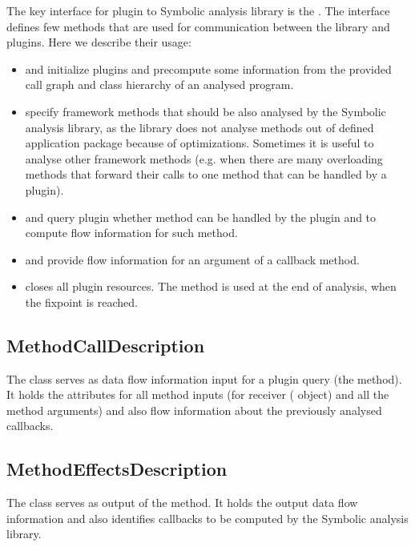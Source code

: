 The key interface for plugin to Symbolic analysis library is the\break
{}.
The interface defines few methods that are used for communication between the library and plugins.
Here we describe their usage:
\begin{itemize}
  \item {} and  initialize plugins
    and precompute some information from the provided call graph and class hierarchy
    of an analysed program.
  \item {} specify framework methods that should
    be also analysed by the Symbolic analysis library, as the library does not
    analyse methods out of defined application package because of optimizations.
    Sometimes it is useful to analyse other framework methods
    (e.g. when there are many overloading methods that forward their calls to one method
    that can be handled by a plugin).
  \item {} and  query plugin whether method can be
    handled by the plugin and to compute flow information for such method.
  \item {} and  provide flow information for
    an argument of a callback method.
  \item {} closes all plugin resources. The method is used at the end of analysis,
    when the fixpoint is reached.
\end{itemize}




\subsection{MethodCallDescription}

The class  serves as data flow information input for a plugin query
(the  method).
It holds the attributes for all method inputs
(for receiver ( object) and all the method arguments)
and also flow information about the previously analysed callbacks.




\subsection{MethodEffectsDescription}

The class  serves as output of the\break
{} method. It holds the output data flow information
and also identifies callbacks to be computed by the Symbolic analysis library.

